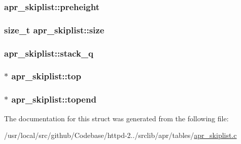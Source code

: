 \subsubsection[{\texorpdfstring{preheight}{preheight}}]{ apr\+\_\+skiplist\+::preheight}\hypertarget{structapr__skiplist_aac080b07ce26442217a23c40bededd74}{}\label{structapr__skiplist_aac080b07ce26442217a23c40bededd74}
\subsubsection[{\texorpdfstring{size}{size}}]{\setlength{\rightskip}{0pt plus 5cm}size\+\_\+t apr\+\_\+skiplist\+::size}\hypertarget{structapr__skiplist_a7a2b190de96ea929162ad49cd3f352d4}{}\label{structapr__skiplist_a7a2b190de96ea929162ad49cd3f352d4}
\subsubsection[{\texorpdfstring{stack\+\_\+q}{stack_q}}]{ apr\+\_\+skiplist\+::stack\+\_\+q}\hypertarget{structapr__skiplist_a5c2f0ab4cd64758bb29d0a54be588aa8}{}\label{structapr__skiplist_a5c2f0ab4cd64758bb29d0a54be588aa8}
\subsubsection[{\texorpdfstring{top}{top}}]{$\ast$ apr\+\_\+skiplist\+::top}\hypertarget{structapr__skiplist_a8523865078175d13ee86bd602191829f}{}\label{structapr__skiplist_a8523865078175d13ee86bd602191829f}
\subsubsection[{\texorpdfstring{topend}{topend}}]{$\ast$ apr\+\_\+skiplist\+::topend}\hypertarget{structapr__skiplist_ab12b78052229c5207f556e27a2d94c23}{}\label{structapr__skiplist_ab12b78052229c5207f556e27a2d94c23}


The documentation for this struct was generated from the following file\+:\begin{DoxyCompactItemize}
\item 
/usr/local/src/github/\+Codebase/httpd-\/2../srclib/apr/tables/\hyperlink{apr__skiplist_8c}{apr\+\_\+skiplist.\+c}\end{DoxyCompactItemize}

